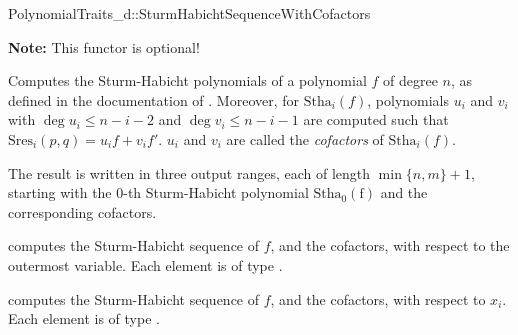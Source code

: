 \begin{ccRefConcept}{PolynomialTraits_d::SturmHabichtSequenceWithCofactors}

\textbf{Note:} This functor is optional!

\ccDefinition

Computes the Sturm-Habicht polynomials of a polynomial $f$ of degree $n$, 
as defined in the documentation of .
Moreover, for $\mathrm{Stha}_i(f)$, polynomials $u_i$ and $v_i$
with $\deg u_i\leq n-i-2$ and $\deg v_i\leq n-i-1$ are computed 
such that $\mathrm{Sres}_i(p,q)=u_i f + v_i f'$. $u_i$ and $v_i$ are called
the \emph{cofactors} of $\mathrm{Stha}_i(f)$.
 
The result is written in three output ranges, each of length $\min\{n,m\}+1$, 
starting with the $0$-th Sturm-Habicht polynomial $\mathrm{Stha_0(f)}$ 
and the corresponding cofactors.


\ccOperations
{}
         { computes the Sturm-Habicht sequence of $f$, and the cofactors, 
           with respect to the outermost variable. Each element is of type
           .}

         { computes the Sturm-Habicht sequence of $f$, and the cofactors, 
           with respect to $x_i$. Each element is of type
           .}


\ccSeeAlso

\\
\\
\\

\end{ccRefConcept}

